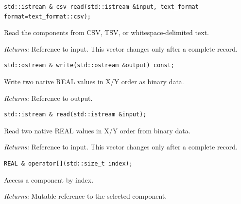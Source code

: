 \par\noindent\begin{minipage}{\linewidth}
\begin{lstlisting}[style=apireference]
std::istream & csv_read(std::istream &input, text_format format=text_format::csv);
\end{lstlisting}
{\footnotesize Read the components from CSV, TSV, or whitespace-delimited text.\par}
{\footnotesize\textit{Returns:} Reference to input. This vector changes only after a complete record.\par}
\end{minipage}\par\vspace{1pt}
\par\noindent\begin{minipage}{\linewidth}
\begin{lstlisting}[style=apireference]
std::ostream & write(std::ostream &output) const;
\end{lstlisting}
{\footnotesize Write two native REAL values in X/Y order as binary data.\par}
{\footnotesize\textit{Returns:} Reference to output.\par}
\end{minipage}\par\vspace{1pt}
\par\noindent\begin{minipage}{\linewidth}
\begin{lstlisting}[style=apireference]
std::istream & read(std::istream &input);
\end{lstlisting}
{\footnotesize Read two native REAL values in X/Y order from binary data.\par}
{\footnotesize\textit{Returns:} Reference to input. This vector changes only after a complete record.\par}
\end{minipage}\par\vspace{1pt}
\par\noindent\begin{minipage}{\linewidth}
\begin{lstlisting}[style=apireference]
REAL & operator[](std::size_t index);
\end{lstlisting}
{\footnotesize Access a component by index.\par}
{\footnotesize\textit{Returns:} Mutable reference to the selected component.\par}
\end{minipage}\par\vspace{1pt}

